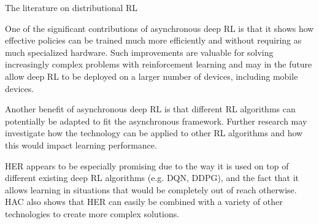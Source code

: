 \documentclass[runningheads]{llncs}
\begin{document}
The literature on distributional RL \todo{}

One of the significant contributions of asynchronous deep RL is that it shows how effective policies can be trained much more efficiently and without requiring as much specialized hardware. Such improvements are valuable for solving increasingly complex problems with reinforcement learning and may in the future allow deep RL to be deployed on a larger number of devices, including mobile devices.

Another benefit of asynchronous deep RL is that different RL algorithms can potentially be adapted to fit the asynchronous framework. Further research may investigate how the technology can be applied to other RL algorithms and how this would impact learning performance.

HER appears to be especially promising due to the way it is used on top of different existing deep RL algorithms (e.g. DQN, DDPG), and the fact that it allows learning in situations that would be completely out of reach otherwise. HAC also shows that HER can easily be combined with a variety of other technologies to create more complex solutions.

%
%



\end{document}
